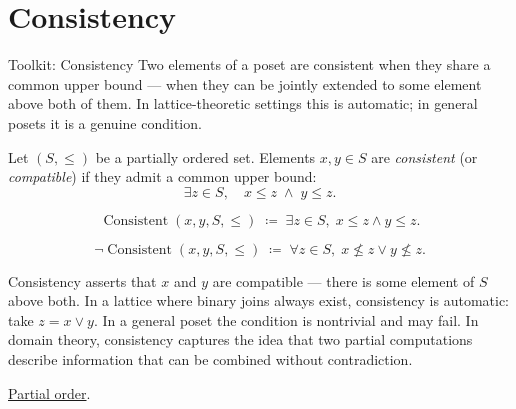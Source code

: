 
\section{Consistency}
\label{sec:consistency}

\begin{toolkitbox}{Toolkit: Consistency}
Two elements of a poset are consistent when they share a common upper
bound — when they can be jointly extended to some element above both of
them.  In lattice-theoretic settings this is automatic; in general posets
it is a genuine condition.
\end{toolkitbox}


\begin{definition}[Consistency]
\label{def:consistency}
Let $(S, \leq)$ be a partially ordered set.  Elements $x, y \in S$ are
\emph{consistent} (or \emph{compatible}) if they admit a common upper
bound:
\[
\exists z \in S, \quad x \leq z \;\land\; y \leq z.
\]
\end{definition}

\begin{remark*}
\[
\operatorname{Consistent}(x, y, S, \leq)
\;\coloneqq\;
\exists z \in S,\; x \leq z \land y \leq z.
\]
\end{remark*}

\begin{remark*}
\[
\neg\operatorname{Consistent}(x, y, S, \leq)
\;\coloneqq\;
\forall z \in S,\; x \not\leq z \lor y \not\leq z.
\]
\end{remark*}

\begin{remark*}[Interpretation]
Consistency asserts that $x$ and $y$ are compatible — there is some
element of $S$ above both.  In a lattice where binary joins always exist,
consistency is automatic: take $z = x \vee y$.  In a general poset the
condition is nontrivial and may fail.  In domain theory, consistency
captures the idea that two partial computations describe information that
can be combined without contradiction.
\end{remark*}

\begin{remark*}[Dependencies]
\hyperref[def:lattice-order-partial-order]{Partial order}.
\end{remark*}
